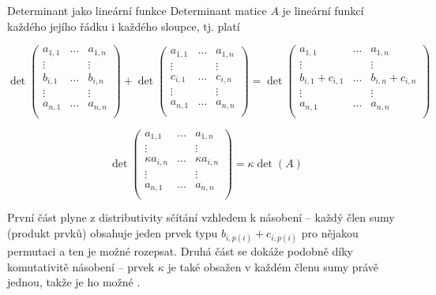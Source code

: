 \begin{vetaN}{Determinant jako lineární funkce}
Determinant matice $A$ je lineární funkcí každého jejího řádku i každého sloupce, tj. platí
\begin{penumerate}
    \item $$\det\left(\begin{matrix}
a_{1,1}& \dots & a_{1,n}\\
\vdots & & \vdots \\
b_{i,1}& \dots & b_{i,n}\\
\vdots & & \vdots \\
a_{n,1}& \dots & a_{n,n}\\
\end{matrix}\right)
+ \det\left(\begin{matrix}
a_{1,1}& \dots & a_{1,n}\\
\vdots & & \vdots \\
c_{i,1}& \dots & c_{i,n}\\
\vdots & & \vdots \\
a_{n,1}& \dots & a_{n,n}\\
\end{matrix}\right)
= \det\left(\begin{matrix}
a_{1,1}& \dots & a_{1,n}\\
\vdots & & \vdots \\
b_{i,1} + c_{i,1}& \dots & b_{i,n} + c_{i,n}\\
\vdots & & \vdots \\
a_{n,1}& \dots & a_{n,n}\\
\end{matrix}\right)$$
    \item $$\det\left(\begin{matrix}
a_{1,1}& \dots & a_{1,n}\\
\vdots & & \vdots \\
\kappa a_{i,n}& \dots & \kappa a_{i,n}\\
\vdots & & \vdots \\
a_{n,1}& \dots & a_{n,n}\\
\end{matrix}\right)
= \kappa \det(A)$$
\end{penumerate}

\begin{dukaz}
První část plyne z distributivity sčítání vzhledem k násobení -- každý člen sumy (produkt prvků) obsahuje jeden prvek typu $b_{i,p(i)} + c_{i,p(i)}$ pro nějakou permutaci a ten je možné rozepsat. Druhá část se dokáže podobně díky komutativitě násobení -- prvek $\kappa$ je také obsažen v každém členu sumy právě jednou, takže je ho možné .
\end{dukaz}
\end{vetaN}

